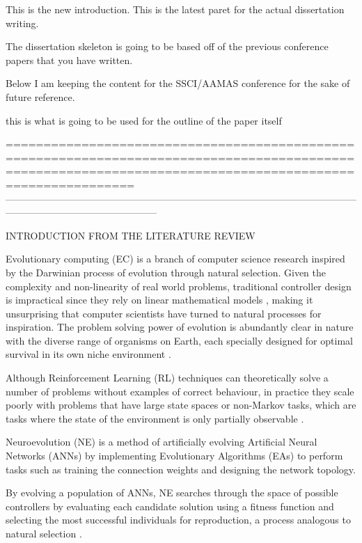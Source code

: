 \documentclass[conference]{IEEEtran}
\begin{document}
This is the new introduction.
This is the latest paret for the actual dissertation writing.

The dissertation skeleton is going to be based off of the previous conference papers that you have written.

Below I am keeping the content for the SSCI/AAMAS conference for the sake of future reference.

this is what is going to be used for the outline of the paper  itself


===========================================================================================================================================================
-----------------------------------------------------------------------------------------------------------------------------------------------------------

INTRODUCTION FROM THE LITERATURE REVIEW

Evolutionary computing (EC) is a branch of computer science research inspired by the Darwinian process of evolution through natural selection\cite{RefWorks:33}. Given the complexity and non-linearity of real world problems, traditional controller design is impractical since they rely on linear mathematical models \cite{RefWorks:32}, making it unsurprising that computer scientists have turned to natural processes for inspiration. The problem solving power of evolution is abundantly clear in nature with the diverse range of organisms on Earth, each specially designed for optimal survival in its own niche environment \cite{RefWorks:33}.

Although Reinforcement Learning (RL) techniques can theoretically solve a number of problems without examples of correct behaviour, in practice they scale poorly with problems that have large state spaces or non-Markov tasks, which are tasks where the state of the environment is only partially observable \cite{RefWorks:32}.

Neuroevolution (NE) is a method of artificially evolving Artificial Neural Networks (ANNs) by implementing Evolutionary Algorithms (EAs) to perform tasks such as training the connection weights and designing the network topology\cite{RefWorks:31,RefWorks:1}. 

By evolving a population of ANNs, NE searches through the space of possible controllers by evaluating each candidate solution using a fitness function and selecting the most successful individuals for reproduction, a process analogous to natural selection \cite{RefWorks:32,gomez2001neuro}. 
\end{document}
